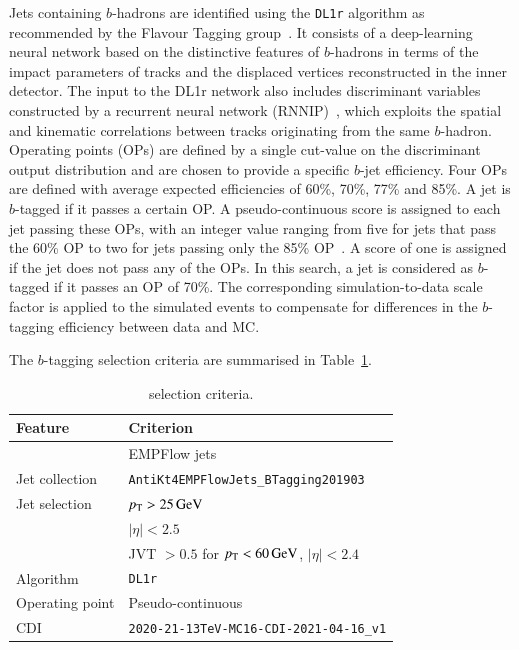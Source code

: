 %
Jets containing $b$-hadrons  are identified using the \texttt{DL1r} algorithm as recommended by the Flavour Tagging group~\cite{twiki:BTagTaggerRecommendationsRelease21}. It consists of a deep-learning neural network based on the distinctive features of $b$-hadrons  in terms of the impact parameters of tracks and the displaced vertices reconstructed in the inner detector.  The input to the DL1r network also includes discriminant variables constructed by a recurrent neural network (RNNIP)~\cite{ATL-PHYS-PUB-2017-003}, which exploits the spatial and kinematic correlations between tracks originating from the same $b$-hadron.  Operating points (OPs) are
defined by a single cut-value on the discriminant output distribution and are chosen to provide a specific $b$-jet efficiency. Four OPs are defined with average expected efficiencies of 60\%, 70\%, 77\% and 85\%. A jet is $b$-tagged if it passes a  certain OP. A pseudo-continuous score is assigned to each jet passing these
OPs, with an integer value ranging from five for jets that pass the 60\% OP to two for jets passing only the
85\% OP~\cite{Aad_2019}. A score of one is assigned if the jet does not pass any of the OPs. In this search, a jet is considered as $b$-tagged if it passes an OP of 70\%. The corresponding simulation-to-data scale factor is applied to the simulated events to compensate for differences in the $b$-tagging efficiency between data and MC.  

The $b$-tagging selection criteria are summarised in Table~\ref{tab:object:btag}.



\begin{table}[ht]
  \caption{\btag selection criteria.}%
  \label{tab:object:btag}
  \centering
  \begin{tabular}{ll}
    \toprule
    Feature & Criterion \\ 
    \midrule
    & EMPFlow jets \\
    \midrule
    Jet collection  & \texttt{AntiKt4EMPFlowJets\_BTagging201903} \\
    Jet selection   & \(\pT > \SI[parse-numbers=false]{25}{\GeV}\) \\
    & \(|\eta| < 2.5\) \\
                    & JVT $>0.5$   for  \(\pT < \SI{60}{\GeV}\), \(|\eta| < 2.4\)\\
    \midrule
    Algorithm   & \texttt{DL1r} \\
    \midrule
    Operating point & Pseudo-continuous \\
    CDI             & \texttt{2020-21-13TeV-MC16-CDI-2021-04-16\_v1}\\
  \bottomrule
  \end{tabular}
\end{table}%
